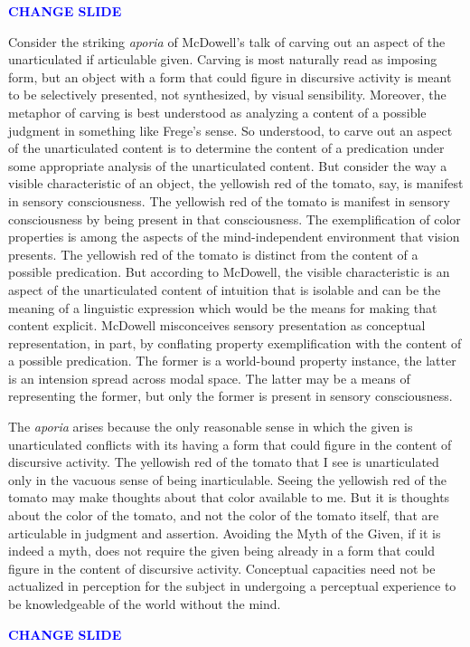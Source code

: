 \documentclass[12pt]{article}
\newcommand{\change}{\textcolor{blue}{\textbf{CHANGE SLIDE}}}
\begin{document}
\change

Consider the striking \emph{aporia} of McDowell's talk of carving out an aspect of the unarticulated if articulable given. Carving is most naturally read as imposing form, but an object with a form that could figure in discursive activity is meant to be selectively presented, not synthesized, by visual sensibility. Moreover, the metaphor of carving is best understood as analyzing a content of a possible judgment in something like Frege's sense. So understood, to carve out an aspect of the unarticulated content is to determine the content of a predication under some appropriate analysis of the unarticulated content. But consider the way a visible characteristic of an object, the yellowish red of the tomato, say, is manifest in sensory consciousness. The yellowish red of the tomato is manifest in sensory consciousness by being present in that consciousness. The exemplification of color properties is among the aspects of the mind-independent environment that vision presents. The yellowish red of the tomato is distinct from the content of a possible predication. But according to McDowell, the visible characteristic is an aspect of the unarticulated content of intuition that is isolable and can be the meaning of a linguistic expression which would be the means for making that content explicit. McDowell misconceives sensory presentation as conceptual representation, in part, by conflating property exemplification with the content of a possible predication. The former is a world-bound property instance, the latter is an intension spread across modal space. The latter may be a means of representing the former, but only the former is present in sensory consciousness.

The \emph{aporia} arises because the only reasonable sense in which the given is unarticulated conflicts with its having a form that could figure in the content of discursive activity. The yellowish red of the tomato that I see is unarticulated only in the vacuous sense of being inarticulable. Seeing the yellowish red of the tomato may make thoughts about that color available to me. But it is thoughts about the color of the tomato, and not the color of the tomato itself, that are articulable in judgment and assertion. Avoiding the Myth of the Given, if it is indeed a myth, does not require the given being already in a form that could figure in the content of discursive activity. Conceptual capacities need not be actualized in perception for the subject in undergoing a perceptual experience to be knowledgeable of the world without the mind.

\change
\end{document}
